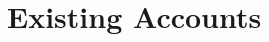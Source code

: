 \documentclass[12pt, UTF8]{article}
\begin{document}
%
%
%
%
%
%
%
%
%
%
%
%



\newpage

\section{Existing Accounts}
\end{document}
